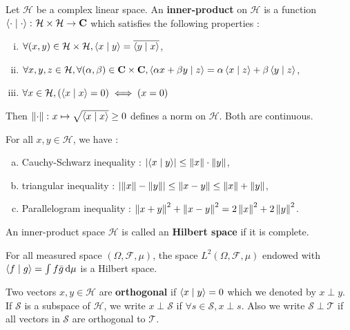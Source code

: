 \begin{defn}
	Let $\mathcal{H}$ be a complex linear space.
	An \textbf{inner-product} on $\mathcal{H}$ is a function $\left\langle \cdot \mid \cdot \right\rangle \colon \mathcal{H} \times \mathcal{H} \to \mathbf{C}$ which satisfies the following properties :
	\begin{enumerate}[(i)]
		\item $\forall (x,y) \in \mathcal{H} \times \mathcal{H}, \left\langle x \mid y \right\rangle = \overline{\left\langle y \mid x \right\rangle}$,
		\item $\forall x, y, z \in \mathcal{H}, \forall (\alpha,\beta) \in \mathbf{C} \times \mathbf{C}, \left\langle \alpha x + \beta y \mid z \right\rangle = \alpha \left\langle x \mid z \right\rangle + \beta \left\langle y \mid z \right\rangle$,
		\item $\forall x \in \mathcal{H}, \left( \left\langle x \mid x \right\rangle = 0 \right) \iff \left( x = 0 \right)$
	\end{enumerate}
	Then $\left\lVert\cdot\right\rVert \colon x \mapsto \sqrt{\left\langle x \mid x \right\rangle} \geq 0$ defines a norm on $\mathcal{H}$.
	Both are continuous.
\end{defn}

\begin{thm}
	For all $x, y \in \mathcal{H}$, we have :
	\begin{enumerate}[a)]
		\item Cauchy-Schwarz inequality : $\left\lvert\left\langle x \mid y \right\rangle\right\rvert \leq \left\lVert x\right\rVert \cdot \left\lVert y\right\rVert$,
		\item triangular inequality : $\left\lvert\left\lVert x\right\rVert - \left\lVert y\right\rVert\right\rvert \leq \left\lVert x - y\right\rVert \leq \left\lVert x\right\rVert + \left\lVert y\right\rVert$,
		\item Parallelogram inequality : $\left\lVert x + y\right\rVert^2 + \left\lVert x - y\right\rVert^2 = 2 \left\lVert x\right\rVert^2 + 2 \left\lVert y\right\rVert^2$.
	\end{enumerate}
\end{thm}

\begin{defn}
	An inner-product space $\mathcal{H}$ is called an \textbf{Hilbert space} if it is complete.
\end{defn}

\begin{pop}
	For all measured space $(\Omega, \mathcal{F}, \mu)$, the space $L^2(\Omega, \mathcal{F}, \mu)$ endowed with $\left\langle f \mid g \right\rangle = \int f \bar{g} \mathop{}\mathopen{}\mathrm{d} \mu$ is a Hilbert space.
\end{pop}

\begin{defn}
	Two vectors $x,y \in \mathcal{H}$ are \textbf{orthogonal} if $\left\langle x \mid y \right\rangle = 0$ which we denoted by $x \perp y$.
	If $\mathcal{S}$ is a subspace of $\mathcal{H}$, we write $x \perp \mathcal{S}$ if $\forall s \in \mathcal{S}, x \perp s$.
	Also we write $\mathcal{S} \perp \mathcal{T}$ if all vectors in $\mathcal{S}$ are orthogonal to $\mathcal{T}$.
\end{defn}

